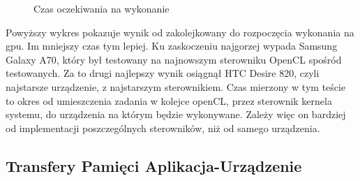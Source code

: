 \begin{figure}[H]
\caption{Czas oczekiwania na wykonanie}
\end{figure}

Powyższy wykres pokazuje wynik od zakolejkowany do rozpoczęcia wykonania na gpu. Im mniejszy czas tym lepiej. Ku zaskoczeniu najgorzej wypada Samsung Galaxy A70, który był testowany na najnowszym sterowniku OpenCL spośród testowanych. Za to drugi najlepszy wynik osiągnął HTC Desire 820, czyli najstarsze urządzenie, z najstarszym sterownikiem. Czas mierzony w tym teście to okres od umieszczenia zadania w kolejce openCL, przez sterownik kernela systemu, do urządzenia na którym będzie wykonywane. Zależy więc on bardziej od implementacji poszczególnych sterowników, niż od samego urządzenia.

\subsection[Transfery Pamięci Aplikacja-Urządzenie]{Transfery Pamięci Aplikacja-Urządzenie}

